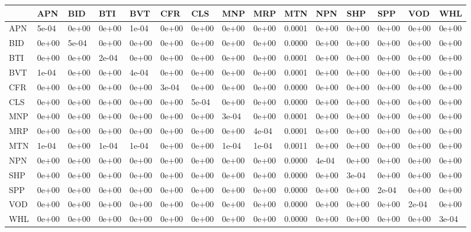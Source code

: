 \documentclass[11pt,preprint, authoryear]{elsarticle}
\let\origtable\table
\let\endorigtable\endtable
\renewenvironment{table}[1][2] {
    \expandafter\origtable\expandafter[H]
} {
    \endorigtable
}
\numberwithin{equation}{section}
\numberwithin{figure}{section}
\numberwithin{table}{section}
\begin{document}
\begin{table}[H]

\caption{\label{tab:Covariance Matrix_I}Covariance Matrix: Industrial}
\centering
\begin{tabular}[t]{l|l|l|l|l|l|l|l|l|l|l|l|l|l|l}
\hline
  & APN & BID & BTI & BVT & CFR & CLS & MNP & MRP & MTN & NPN & SHP & SPP & VOD & WHL\\
\hline
APN & 5e-04 & 0e+00 & 0e+00 & 1e-04 & 0e+00 & 0e+00 & 0e+00 & 0e+00 & 0.0001 & 0e+00 & 0e+00 & 0e+00 & 0e+00 & 0e+00\\
\hline
BID & 0e+00 & 5e-04 & 0e+00 & 0e+00 & 0e+00 & 0e+00 & 0e+00 & 0e+00 & 0.0000 & 0e+00 & 0e+00 & 0e+00 & 0e+00 & 0e+00\\
\hline
BTI & 0e+00 & 0e+00 & 2e-04 & 0e+00 & 0e+00 & 0e+00 & 0e+00 & 0e+00 & 0.0001 & 0e+00 & 0e+00 & 0e+00 & 0e+00 & 0e+00\\
\hline
BVT & 1e-04 & 0e+00 & 0e+00 & 4e-04 & 0e+00 & 0e+00 & 0e+00 & 0e+00 & 0.0001 & 0e+00 & 0e+00 & 0e+00 & 0e+00 & 0e+00\\
\hline
CFR & 0e+00 & 0e+00 & 0e+00 & 0e+00 & 3e-04 & 0e+00 & 0e+00 & 0e+00 & 0.0000 & 0e+00 & 0e+00 & 0e+00 & 0e+00 & 0e+00\\
\hline
CLS & 0e+00 & 0e+00 & 0e+00 & 0e+00 & 0e+00 & 5e-04 & 0e+00 & 0e+00 & 0.0000 & 0e+00 & 0e+00 & 0e+00 & 0e+00 & 0e+00\\
\hline
MNP & 0e+00 & 0e+00 & 0e+00 & 0e+00 & 0e+00 & 0e+00 & 3e-04 & 0e+00 & 0.0001 & 0e+00 & 0e+00 & 0e+00 & 0e+00 & 0e+00\\
\hline
MRP & 0e+00 & 0e+00 & 0e+00 & 0e+00 & 0e+00 & 0e+00 & 0e+00 & 4e-04 & 0.0001 & 0e+00 & 0e+00 & 0e+00 & 0e+00 & 0e+00\\
\hline
MTN & 1e-04 & 0e+00 & 1e-04 & 1e-04 & 0e+00 & 0e+00 & 1e-04 & 1e-04 & 0.0011 & 0e+00 & 0e+00 & 0e+00 & 0e+00 & 0e+00\\
\hline
NPN & 0e+00 & 0e+00 & 0e+00 & 0e+00 & 0e+00 & 0e+00 & 0e+00 & 0e+00 & 0.0000 & 4e-04 & 0e+00 & 0e+00 & 0e+00 & 0e+00\\
\hline
SHP & 0e+00 & 0e+00 & 0e+00 & 0e+00 & 0e+00 & 0e+00 & 0e+00 & 0e+00 & 0.0000 & 0e+00 & 3e-04 & 0e+00 & 0e+00 & 0e+00\\
\hline
SPP & 0e+00 & 0e+00 & 0e+00 & 0e+00 & 0e+00 & 0e+00 & 0e+00 & 0e+00 & 0.0000 & 0e+00 & 0e+00 & 2e-04 & 0e+00 & 0e+00\\
\hline
VOD & 0e+00 & 0e+00 & 0e+00 & 0e+00 & 0e+00 & 0e+00 & 0e+00 & 0e+00 & 0.0000 & 0e+00 & 0e+00 & 0e+00 & 2e-04 & 0e+00\\
\hline
WHL & 0e+00 & 0e+00 & 0e+00 & 0e+00 & 0e+00 & 0e+00 & 0e+00 & 0e+00 & 0.0000 & 0e+00 & 0e+00 & 0e+00 & 0e+00 & 3e-04\\
\hline
\end{tabular}
\end{table}
\end{document}
